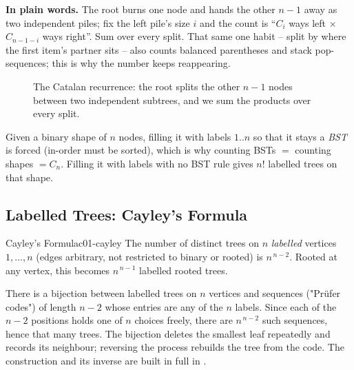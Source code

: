 \noindent\textbf{In plain words.} The root burns one node and hands the other $n-1$ away
as two independent piles; fix the left pile's size $i$ and the count is
``$C_i$ ways left $\times$ $C_{n-1-i}$ ways right''. Sum over every split. That same
one habit -- split by where the first item's partner sits -- also counts balanced
parentheses and stack pop-sequences; this is why the number keeps reappearing.

\begin{figure}[H]
\centering
{}
\caption{The Catalan recurrence: the root splits the other $n-1$ nodes between two
independent subtrees, and we sum the products over every split.}\label{fig:c01-catalan-split}
\end{figure}

\begin{notebox}
Given a binary shape of $n$ nodes, filling it with labels $1..n$ so that it stays a
\emph{BST} is forced (in-order must be sorted), which is why counting BSTs $=$ counting
shapes $= C_n$. Filling it with labels with no BST rule gives $n!$ labelled trees on that
shape.
\end{notebox}

\subsection{Labelled Trees: Cayley's Formula}

\begin{theorem}{Cayley's Formula}{c01-cayley}
The number of distinct trees on $n$ \emph{labelled} vertices $1,\dots,n$ (edges arbitrary,
not restricted to binary or rooted) is $n^{\,n-2}$. Rooted at any vertex, this becomes
$n^{\,n-1}$ labelled rooted trees.
\end{theorem}
\begin{proofbox}
There is a bijection between labelled trees on $n$ vertices and sequences ("Pr\"ufer codes")
of length $n-2$ whose entries are any of the $n$ labels. Since each of the $n-2$ positions
holds one of $n$ choices freely, there are $n^{\,n-2}$ such sequences, hence that many
trees. The bijection deletes the smallest leaf repeatedly and records its neighbour;
reversing the process rebuilds the tree from the code. The construction and its inverse
are built in full in .
\end{proofbox}

